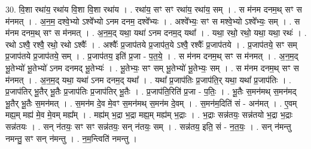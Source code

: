 \documentclass[17pt]{extarticle}
\begin{document}
30. वि॒शा रथा॑य॒ रथा॑य वि॒शा वि॒शा रथा॑य । . रथा॑य॒ सꣳ सꣳ रथा॑य॒ रथा॑य॒ सम् । . स म॑नम दनम॒थ् सꣳ स म॑नमत् । . अ॒न॒म॒ दश्वे॒भ्यो ऽश्वे᳚भ्यो ऽनम दनम॒ दश्वे᳚भ्यः । . अश्वे᳚भ्यः॒ सꣳ स मश्वे॒भ्यो ऽश्वे᳚भ्यः॒ सम् । . स म॑नम दनम॒थ् सꣳ स म॑नमत् । . अ॒न॒म॒द् यथा॒ यथा॑ ऽनम दनम॒द् यथा᳚ । . यथा॒ रथो॒ रथो॒ यथा॒ यथा॒ रथः॑ । . रथो ऽश्वै॒ रश्वै॒ रथो॒ रथो ऽश्वैः᳚ । . अश्वैः᳚ प्र॒जाप॑तये प्र॒जाप॑त॒ये ऽश्वै॒ रश्वैः᳚ प्र॒जाप॑तये । . प्र॒जाप॑तये॒ सꣳ सम् प्र॒जाप॑तये प्र॒जाप॑तये॒ सम् । . प्र॒जाप॑तय॒ इति॑ प्र॒जा - प॒त॒ये॒ । . स म॑नम दनम॒थ् सꣳ स म॑नमत् । . अ॒न॒म॒द् भू॒तेभ्यो॑ भू॒तेभ्यो॑ ऽनम दनमद् भू॒तेभ्यः॑ । . भू॒तेभ्यः॒ सꣳ सम् भू॒तेभ्यो॑ भू॒तेभ्यः॒ सम् । . स म॑नम दनम॒थ् सꣳ स म॑नमत् । . अ॒न॒म॒द् यथा॒ यथा॑ ऽनम दनम॒द् यथा᳚ । . यथा᳚ प्र॒जाप॑तिः प्र॒जाप॑ति॒र् यथा॒ यथा᳚ प्र॒जाप॑तिः । . प्र॒जाप॑तिर् भू॒तैर् भू॒तैः प्र॒जाप॑तिः प्र॒जाप॑तिर् भू॒तैः । . प्र॒जाप॑ति॒रिति॑ प्र॒जा - प॒तिः॒ । . भू॒तैः स॒मन॑मथ् स॒मन॑मद् भू॒तैर् भू॒तैः स॒मन॑मत् । . स॒मन॑म दे॒व मे॒वꣳ स॒मन॑मथ् स॒मन॑म दे॒वम् । . स॒मन॑म॒दिति॑ सं - अन॑मत् । . ए॒वम् मह्य॒म् मह्य॑ मे॒व मे॒वम् मह्य᳚म् । . मह्य॑म् भ॒द्रा भ॒द्रा मह्य॒म् मह्य॑म् भ॒द्राः । . भ॒द्राः सन्न॑तयः॒ सन्न॑तयो भ॒द्रा भ॒द्राः सन्न॑तयः । . सन् न॑तयः॒ सꣳ सꣳ सन्न॑तयः॒ सन् न॑तयः॒ सम् । . सन्न॑तय॒ इति॒ सं - न॒त॒यः॒ । . सन् न॑मन्तु नमन्तु॒ सꣳ सन् न॑मन्तु । . न॒म॒न्त्विति॑ नमन्तु । \newline
\end{document}
